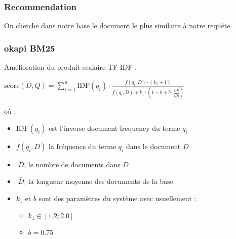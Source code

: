 \begin{frame}
  \frametitle{Recommendation}
  On cherche dans notre base le document le plus similaire à notre requète.
\end{frame}

\begin{frame}
  \frametitle{okapi BM25}
  Amélioration du produit scalaire TF-IDF : \\
  \begin{center}
  ${\text{score}}(D,Q)=\sum _{i=1}^{n}{\text{IDF}}(q_{i})\cdot {\frac {f(q_{i},D)\cdot (k_{1}+1)}{f(q_{i},D)+k_{1}\cdot \left(1-b+b\cdot {\frac {|D|}{\bar{|D|}}}\right)}}$\\
  \end{center}
  où :
  \begin{itemize}
  \item ${\text{IDF}}(q_{i})$ est l'inverse document frequency du terme $q_i$
  \item $f(q_{i},D)$ la fréquence du terme $q_i$ dans le document $D$
  \item ${|D|}$ le nombre de documents dans $D$
  \item $\bar{|D|}$ la longueur moyenne des documents de la base
  \item $k_1$ et $b$ sont des paramètres du système avec usuellement :
  \begin{itemize}
    \item $k_1 \in [1.2;2.0]$
    \item $b = 0.75$
  \end{itemize}
  \end{itemize}
\end{frame}
